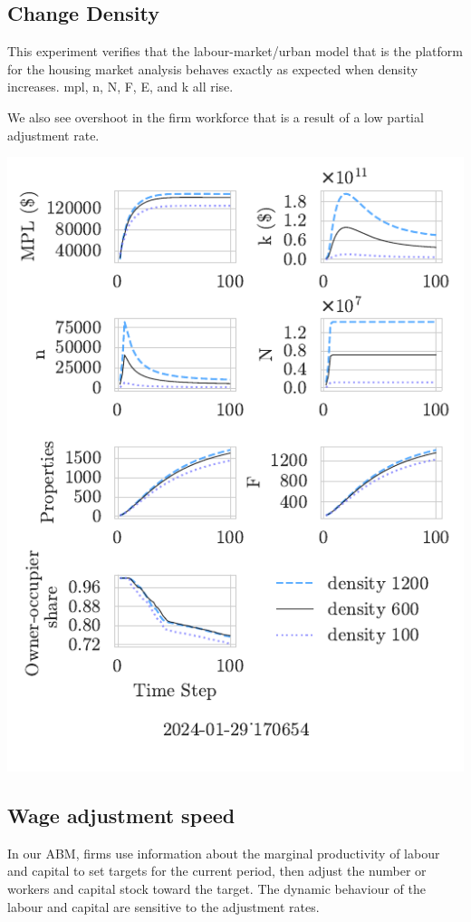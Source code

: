  \subsection{Change Density}
 This experiment verifies that the labour-market/urban model that is the platform for the housing market analysis behaves exactly as expected when density increases. mpl, n, N, F, E, and k all rise. 

 We also see overshoot in the firm workforce that is a result of a low partial adjustment rate.

 

 \includegraphics[]{fig/Analysis/density-2024-01-29_170654.pdf}


\newpage %
\subsection{Wage  adjustment  speed} 
In our ABM, firms use information about the  marginal productivity of labour and capital to set targets for the current period, then adjust the number or workers and capital stock toward the target. The dynamic behaviour of the labour and capital are sensitive to the adjustment rates. 

